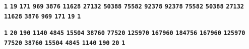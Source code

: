 \documentclass{article}
\begin{document}
\hfil
\begin{minipage}{25.000000cm}
\textbf{\texttt{\Large 1}} \hfil \textbf{\texttt{\Large 19}} \hfil \textbf{\texttt{\Large 171}} \hfil \textbf{\texttt{\Large 969}} \hfil \textbf{\texttt{\Large 3876}} \hfil \textbf{\texttt{\Large 11628}} \hfil \textbf{\texttt{\Large 27132}} \hfil \textbf{\texttt{\Large 50388}} \hfil \textbf{\texttt{\Large 75582}} \hfil \textbf{\texttt{\Large 92378}} \hfil \textbf{\texttt{\Large 92378}} \hfil \textbf{\texttt{\Large 75582}} \hfil \textbf{\texttt{\Large 50388}} \hfil \textbf{\texttt{\Large 27132}} \hfil \textbf{\texttt{\Large 11628}} \hfil \textbf{\texttt{\Large 3876}} \hfil \textbf{\texttt{\Large 969}} \hfil \textbf{\texttt{\Large 171}} \hfil \textbf{\texttt{\Large 19}} \hfil \textbf{\texttt{\Large 1}}
\end{minipage} 
\hfil
\par
\vfil



\hfil
\begin{minipage}{26.250000cm}
\textbf{\texttt{\Large 1}} \hfil \textbf{\texttt{\Large 20}} \hfil \textbf{\texttt{\Large 190}} \hfil \textbf{\texttt{\Large 1140}} \hfil \textbf{\texttt{\Large 4845}} \hfil \textbf{\texttt{\Large 15504}} \hfil \textbf{\texttt{\Large 38760}} \hfil \textbf{\texttt{\Large 77520}} \hfil \textbf{\texttt{\Large 125970}} \hfil \textbf{\texttt{\Large 167960}} \hfil \textbf{\texttt{\Large 184756}} \hfil \textbf{\texttt{\Large 167960}} \hfil \textbf{\texttt{\Large 125970}} \hfil \textbf{\texttt{\Large 77520}} \hfil \textbf{\texttt{\Large 38760}} \hfil \textbf{\texttt{\Large 15504}} \hfil \textbf{\texttt{\Large 4845}} \hfil \textbf{\texttt{\Large 1140}} \hfil \textbf{\texttt{\Large 190}} \hfil \textbf{\texttt{\Large 20}} \hfil \textbf{\texttt{\Large 1}}
\end{minipage} 
\hfil
\par
\vfil
\end{document}
